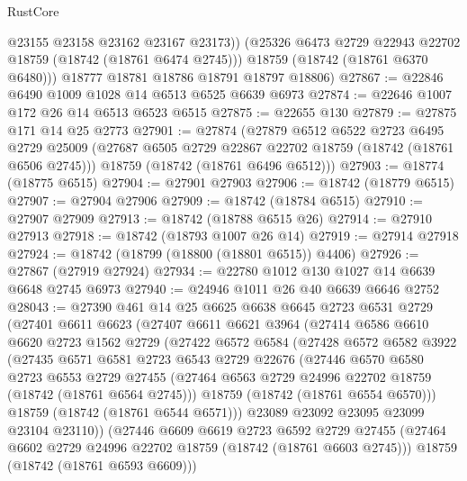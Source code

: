 \begin{lexlean}{RustCore}
\begin{coremodule}
            @23155
            @23158
            @23162
            @23167
            @23173))
        (@25326 @6473 @2729 @22943 @22702 @18759 (@18742 (@18761 @6474 @2745)))
        @18759
        (@18742 (@18761 @6370 @6480)))
      @18777
      @18781
      @18786
      @18791
      @18797
      @18806)
@27867 := @22846 @6490 @1009 @1028 @14 @6513 @6525 @6639 @6973
@27874 := @22646 @1007 @172 @26 @14 @6513 @6523 @6515
@27875 := @22655 @130
@27879 := @27875 @171 @14 @25 @2773
@27901 := @27874
    (@27879
      @6512
      @6522
      @2723
      @6495
      @2729
      @25009
      (@27687 @6505 @2729 @22867 @22702 @18759 (@18742 (@18761 @6506 @2745)))
      @18759
      (@18742 (@18761 @6496 @6512)))
@27903 := @18774 (@18775 @6515)
@27904 := @27901 @27903
@27906 := @18742 (@18779 @6515)
@27907 := @27904 @27906
@27909 := @18742 (@18784 @6515)
@27910 := @27907 @27909
@27913 := @18742 (@18788 @6515 @26)
@27914 := @27910 @27913
@27918 := @18742 (@18793 @1007 @26 @14)
@27919 := @27914 @27918
@27924 := @18742 (@18799 (@18800 (@18801 @6515)) @4406)
@27926 := @27867 (@27919 @27924)
@27934 := @22780 @1012 @130 @1027 @14 @6639 @6648 @2745 @6973
@27940 := @24946 @1011 @26 @40 @6639 @6646 @2752
@28043 := @27390
    @461
    @14
    @25
    @6625
    @6638
    @6645
    @2723
    @6531
    @2729
    (@27401
      @6611
      @6623
      (@27407
        @6611
        @6621
        @3964
        (@27414
          @6586
          @6610
          @6620
          @2723
          @1562
          @2729
          (@27422
            @6572
            @6584
            (@27428
              @6572
              @6582
              @3922
              (@27435
                @6571
                @6581
                @2723
                @6543
                @2729
                @22676
                (@27446
                  @6570
                  @6580
                  @2723
                  @6553
                  @2729
                  @27455
                  (@27464 @6563 @2729 @24996 @22702 @18759 (@18742 (@18761 @6564 @2745)))
                  @18759
                  (@18742 (@18761 @6554 @6570)))
                @18759
                (@18742 (@18761 @6544 @6571)))
              @23089
              @23092
              @23095
              @23099
              @23104
              @23110))
          (@27446
            @6609
            @6619
            @2723
            @6592
            @2729
            @27455
            (@27464 @6602 @2729 @24996 @22702 @18759 (@18742 (@18761 @6603 @2745)))
            @18759
            (@18742 (@18761 @6593 @6609)))

\end{coremodule}
\end{lexlean}

